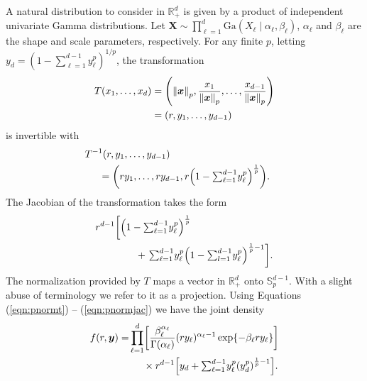A natural  distribution to consider in ${\mathbb R}^d_+$ is given by a product of independent
  univariate Gamma distributions. Let
    $\bm{ X} \sim \prod_{\ell = 1}^d\text{Ga}\left(X_{\ell}\mid\alpha_{\ell},\beta_{\ell}\right)$, 
    $\alpha_\ell$ and $\beta_\ell$ are the shape and scale parameters, respectively. 
    For any finite $p$, letting 
   $ y_d = (1 - {\textstyle\sum}_{\ell = 1}^{d-1}y_{\ell}^p)^{1/p}$,
    the transformation
  \begin{equation}
    \label{eqn:pnormt}
    \begin{aligned}
    T(x_1,\ldots,x_d) &= \left(\pnorm{\bm{x}}{p}, \frac{x_1}{\pnorm{\bm{x}}{p}},
                          \ldots , \frac{x_{d-1}}{\pnorm{\bm{x}}{p}}\right) \\
                        &= (r,y_1,\ldots,y_{d-1})
    \end{aligned}
  \end{equation}
  is invertible with
  \begin{equation}
    \label{eqn:pnormtinv}
    \begin{aligned}
    &\hspace{-0.5cm}T^{-1}\left(r,y_1,\ldots,y_{d-1}\right)\\
      & = \left(ry_1,\ldots,ry_{d-1}, 
        r\left(1 - {\textstyle\sum}_{\ell = 1}^{d-1}y_{\ell}^p\right)^{\frac{1}{p}}\right).
    \end{aligned}
  \end{equation}
  The Jacobian of the transformation takes the form
  \begin{equation}
    \label{eqn:pnormjac}
    \begin{aligned}
    r^{d-1}\left[\left(1 - {\textstyle\sum}_{\ell = 1}^{d-1}y_{\ell}^p\right)^{\frac{1}{p}} \right. & \\
        &\hspace{-2cm}+ \left. {\textstyle\sum}_{\ell = 1}^{d-1}y_{\ell}^p
          \left(1 - {\textstyle\sum}_{l=1}^{d-1} y_{\ell}^p\right)^{\frac{1}{p} - 1}\right].
    \end{aligned}
  \end{equation}
  The normalization provided by $T$ maps a vector in ${\mathbb R}_+^d$ onto
  ${\mathbb S}_p^{d-1} $. With a slight abuse of terminology we refer to it as a
  projection. Using Equations (\ref{eqn:pnormt}) -- (\ref{eqn:pnormjac}) we have the joint density
  \begin{equation}
  \label{joint}
    \begin{aligned}
    f(r,\bm{ y}) = &\prod_{\ell = 1}^{d}
      \left[\frac{\beta_{\ell}^{\alpha_{\ell}}}{\Gamma(\alpha_{\ell})}(ry_{\ell})^{\alpha_{\ell} - 1}
          \exp\lbrace-\beta_{\ell}ry_{\ell}\rbrace\right] \\
      &\hspace{0.5cm}\times r^{d-1}\left[y_d +
            {\textstyle \sum}_{\ell = 1}^{d-1}y_{\ell}^p\left(y_d^p\right)^{\frac{1}{p} - 1}\right].
    \end{aligned}
  \end{equation}
